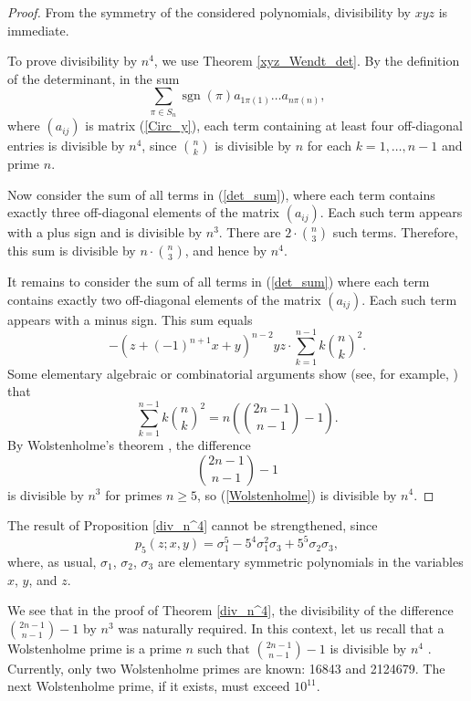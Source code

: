 \documentclass[14pt, dvipsnames]{extarticle}
\theoremstyle{definition}
\theoremstyle{definition}
\theoremstyle{remark}
\DeclareMathOperator{\sgn}{\mathrm{sgn}}
\begin{document}
\begin{proof}
From the symmetry of the considered polynomials, divisibility by $xyz$ is immediate.

To prove divisibility by $n^4$, we use Theorem \ref{xyz_Wendt_det}. By the definition of the determinant, in the sum
\begin{equation}\label{det_sum}
\sum\limits_{\pi\in S_n} \sgn(\pi) a_{1\pi(1)}\dots a_{n\pi(n)},
\end{equation}
where $(a_{ij})$ is matrix (\ref{Circ_y}), each term containing at least four off-diagonal entries is divisible by $n^4$, since $\binom{n}{k}$ is divisible by $n$ for each $k = 1, \dots, n-1$ and prime $n$.

Now consider the sum of all terms in (\ref{det_sum}), where each term contains exactly three off-diagonal elements of the matrix $(a_{ij})$. Each such term appears with a plus sign and is divisible by $n^3$. There are $2\cdot\binom{n}{3}$ such terms. Therefore, this sum is divisible by $n\cdot \binom{n}{3}$, and hence by $n^4$.

It remains to consider the sum of all terms in (\ref{det_sum}) where each term contains exactly two off-diagonal elements of the matrix $(a_{ij})$. Each such term appears with a minus sign. This sum equals
$$-(z + (-1)^{n+1}x + y)^{n-2}yz\cdot \sum\limits_{k=1}^{n-1} k \binom{n}{k}^2.$$
Some elementary algebraic or combinatorial arguments show (see, for example, \cite{MS_binomial}) that
\begin{equation}\label{Wolstenholme}
\sum\limits_{k=1}^{n-1} k \binom{n}{k}^2 = n\left ( \binom{2n-1}{n-1} - 1 \right ).
\end{equation}
By Wolstenholme's theorem \cite{Wolstenholme62}, the difference
$$\binom{2n-1}{n-1} - 1$$
is divisible by $n^3$ for primes $n \geqslant 5$, so (\ref{Wolstenholme}) is divisible by $n^4$.      
\end{proof}

The result of Proposition \ref{div_n^4} cannot be strengthened, since
$$p_5(z; x, y) = \sigma_1^5 - 5^4\sigma_1^2\sigma_3 + 5^5\sigma_2\sigma_3,$$
where, as usual, $\sigma_1$, $\sigma_2$, $\sigma_3$ are elementary symmetric polynomials in the variables $x$, $y$, and $z$.

We see that in the proof of Theorem \ref{div_n^4}, the divisibility of the difference $\binom{2n-1}{n-1} - 1$ by $n^3$ was naturally required. In this context, let us recall that a Wolstenholme prime is a prime $n$ such that $\binom{2n-1}{n-1} - 1$ is divisible by $n^4$ \cite{MathWorld_Wolstenholme}. Currently, only two Wolstenholme primes are known: 16843 and 2124679. The next Wolstenholme prime, if it exists, must exceed $10^{11}$.
\end{document}
